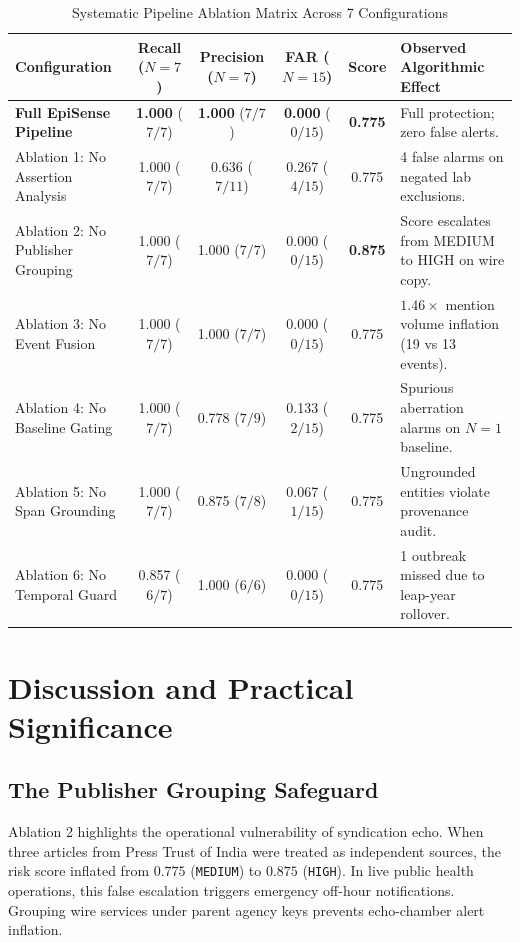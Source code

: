 \documentclass[conference]{IEEEtran}
\begin{document}
\begin{table}[htbp]
\caption{Systematic Pipeline Ablation Matrix Across 7 Configurations}
\label{tab:ablation}
\begin{center}
\begin{tabular}{lccccl}
\toprule
\textbf{Configuration} & \textbf{Recall ($N=7$)} & \textbf{Precision ($N=7$)} & \textbf{FAR ($N=15$)} & \textbf{Score} & \textbf{Observed Algorithmic Effect} \\
\midrule
\textbf{Full EpiSense Pipeline} & \textbf{1.000} ($7/7$) & \textbf{1.000} ($7/7$) & \textbf{0.000} ($0/15$) & \textbf{0.775} & Full protection; zero false alerts. \\
Ablation 1: No Assertion Analysis & 1.000 ($7/7$) & 0.636 ($7/11$) & 0.267 ($4/15$) & 0.775 & 4 false alarms on negated lab exclusions. \\
Ablation 2: No Publisher Grouping & 1.000 ($7/7$) & 1.000 ($7/7$) & 0.000 ($0/15$) & \textbf{0.875} & Score escalates from MEDIUM to HIGH on wire copy. \\
Ablation 3: No Event Fusion & 1.000 ($7/7$) & 1.000 ($7/7$) & 0.000 ($0/15$) & 0.775 & $1.46\times$ mention volume inflation (19 vs 13 events). \\
Ablation 4: No Baseline Gating & 1.000 ($7/7$) & 0.778 ($7/9$) & 0.133 ($2/15$) & 0.775 & Spurious aberration alarms on $N=1$ baseline. \\
Ablation 5: No Span Grounding & 1.000 ($7/7$) & 0.875 ($7/8$) & 0.067 ($1/15$) & 0.775 & Ungrounded entities violate provenance audit. \\
Ablation 6: No Temporal Guard & 0.857 ($6/7$) & 1.000 ($6/6$) & 0.000 ($0/15$) & 0.775 & 1 outbreak missed due to leap-year rollover. \\
\bottomrule
\end{tabular}
\end{center}
\end{table}

\section{Discussion and Practical Significance}
\subsection{The Publisher Grouping Safeguard}
Ablation 2 highlights the operational vulnerability of syndication echo. When three articles from Press Trust of India were treated as independent sources, the risk score inflated from $0.775$ (\texttt{MEDIUM}) to $0.875$ (\texttt{HIGH}). In live public health operations, this false escalation triggers emergency off-hour notifications. Grouping wire services under parent agency keys prevents echo-chamber alert inflation.
\end{document}
